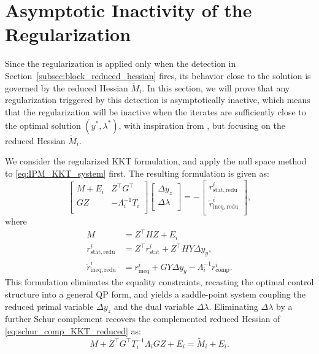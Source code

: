 \documentclass[class=scrbook, crop=false]{standalone}
\begin{document}
\section{Asymptotic Inactivity of the Regularization}
\label{sec:asymptotic_inactivity}
Since the regularization is applied only when the detection in Section~\ref{subsec:block_reduced_hessian} fires,
its behavior close to the solution is governed by the reduced Hessian $\tilde{M}_i$.
In this section,
we will prove that any regularization triggered by this detection is asymptotically inactive,
which means that the regularization will be inactive when the iterates are sufficiently close to the optimal solution $(y^*, \lambda^*)$,
with inspiration from \cite{absilNewtonKKTInteriorpointMethods2007}, but focusing on the reduced Hessian $\tilde{M}_i$.

We consider the regularized KKT formulation, and apply the null space method to \eqref{eq:IPM_KKT_system} first.
The resulting formulation is given as:
\begin{equation}
    \begin{bmatrix}
    M + E_i & Z^\top G^\top\\
    GZ & -\Lambda_i^{-1}T_i\\
    \end{bmatrix}
    \begin{bmatrix}
    \Delta y_z \\
    \Delta \lambda \\
    \end{bmatrix} = -
    \begin{bmatrix}
    r_{\mathrm{stat, redu}}^i \\
    \tilde{r}_{\mathrm{ineq, redu}}^i \\
    \end{bmatrix},
    \label{eq:reduced_KKT_system_schur}
\end{equation}
where
\begin{align*}
    M &= Z^\top H Z + E_i \\
    r_{\mathrm{stat, redu}}^i &= Z^\top r_{\mathrm{stat}}^i + Z^\top H Y \Delta y_y, \\
    \tilde{r}_{\mathrm{ineq, redu}}^i &=  r_{\mathrm{ineq}}^i + G Y \Delta y_y - \Lambda_i^{-1}r_{\mathrm{comp}}^i.
\end{align*}
This formulation eliminates the equality constraints, recasting the optimal control structure into a general QP form, 
and yields a saddle-point system coupling the reduced primal variable $\Delta y_z$ and the dual variable $\Delta\lambda$.
Eliminating $\Delta\lambda$ by a further Schur complement recovers the complemented reduced Hessian of \eqref{eq:schur_comp_KKT_reduced} as:
\begin{equation*}
    M + Z^\top G^\top T_i^{-1}\Lambda_i G Z + E_i = \tilde{M}_i + E_i.
\end{equation*}
\end{document}
